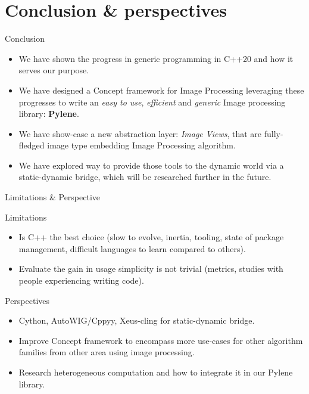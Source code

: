 \documentclass[12pt,aspectratio=169]{beamer}
\begin{document}
%
%
%

\section[Conclusion \& perspectives]{Conclusion \& perspectives}

\begin{frame}{Conclusion}
  \begin{itemize}
    \item We have shown the progress in generic programming in C++20 and how it serves our purpose.
    \item We have designed a Concept framework for Image Processing leveraging these progresses to write an \emph{easy
            to use}, \emph{efficient} and \emph{generic} Image processing library: \textbf{Pylene}.
    \item We have show-case a new abstraction layer: \emph{Image Views}, that are fully-fledged image type embedding
          Image Processing algorithm.
    \item We have explored way to provide those tools to the dynamic world via a static-dynamic bridge, which will be
          researched further in the future.
  \end{itemize}
\end{frame}

\begin{frame}{Limitations \& Perspective}
  \begin{alertblock}{Limitations}
    \begin{itemize}
      \item Is C++ the best choice (slow to evolve, inertia, tooling, state of package management, difficult languages
            to learn compared to others).
      \item Evaluate the gain in usage simplicity is not trivial (metrics, studies with people experiencing writing
            code).
    \end{itemize}
  \end{alertblock}
  \begin{alertblock}{Perspectives}
    \begin{itemize}
      \item Cython, AutoWIG/Cppyy, Xeus-cling for static-dynamic bridge.
      \item Improve Concept framework to encompass more use-cases for other algorithm families from other area using
            image processing.
      \item Research heterogeneous computation and how to integrate it in our Pylene library.
    \end{itemize}
  \end{alertblock}
\end{frame}
\end{document}
